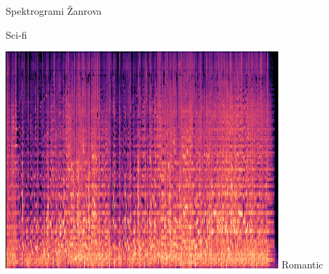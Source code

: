 \documentclass{beamer}
\begin{document}
\begin{frame}{Spektrogrami Žanrova}
\begin{minipage}{0.3\linewidth}
	Sci-fi
\end{minipage}%
\begin{minipage}{0.3\linewidth}
  \includegraphics[width=\linewidth]{slike/romantic00.png} 
	Romantic
\end{minipage}%
\end{frame}
\end{document}
